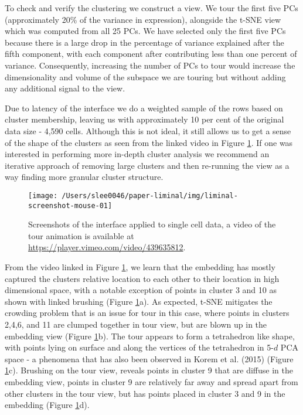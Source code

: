 \documentclass[article,notitle]{jdssv}
\begin{document}
To check and verify the clustering we construct a  view.
We tour the first five PCs (approximately 20\% of the variance in expression),
alongside the t-SNE view which was computed from all 25 PCs. We have selected only the first five PCs because there is a large drop in the percentage of variance explained after the fifth component, with each component after contributing less than one percent of variance.
Consequently, increasing the number of PCs to tour would increase the dimensionality and volume of the subspace we are touring but without adding any additional signal to the view.

Due to latency of the  interface we do a weighted sample of the rows based on
cluster membership, leaving us with approximately 10 per cent of the original
data size - 4,590 cells. Although this is not ideal, it still allows us to
get a sense of the shape of the clusters as seen from the linked video in Figure \ref{fig:mouse-01}. If one was interested in performing more in-depth cluster analysis we recommend an iterative approach of removing large clusters and then re-running the  view as a way finding more granular cluster structure.



\begin{figure}

{\centering \texttt{[image: /Users/slee0046/paper-liminal/img/liminal-screenshot-mouse-01]} 

}

\caption{Screenshots of the  interface applied to single cell data, a video of the tour animation is available at \url{https://player.vimeo.com/video/439635812}.}\label{fig:mouse-01}
\end{figure}

From the video linked in Figure \ref{fig:mouse-01}, we learn that the embedding has mostly captured the
clusters relative location to each other to their location in high dimensional space, with a notable exception of points in cluster 3 and 10 as shown with
linked brushing (Figure \ref{fig:mouse-01}a). As expected, t-SNE mitigates the crowding problem that is
an issue for tour in this case, where points in clusters 2,4,6, and 11 are
clumped together in tour view, but are blown up in the embedding view (Figure \ref{fig:mouse-01}b).
The tour appears to form a tetrahedron like shape, with points lying on
surface and along the vertices of the tetrahedron in 5-\(d\) PCA space -
a phenomena that has also been observed in Korem et al. (2015)
(Figure \ref{fig:mouse-01}c). Brushing on
the tour view, reveals points in cluster 9 that are diffuse in the embedding
view, points in cluster 9 are relatively far away and spread apart from other
clusters in the tour view, but has points placed in cluster 3 and 9 in the embedding
(Figure \ref{fig:mouse-01}d).
\end{document}
